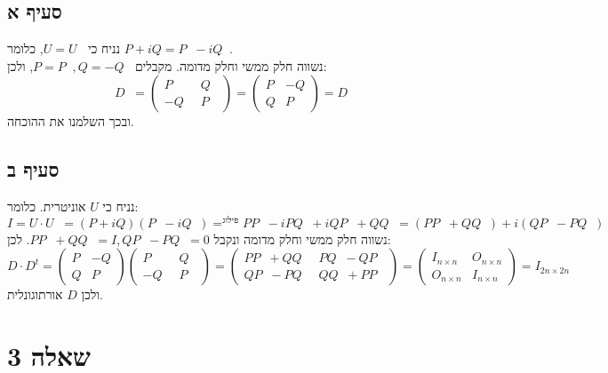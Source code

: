 \documentclass{article}
\DeclareMathOperator*{\equals}{=}
\DeclareMathOperator{\adj}{^\ast}
\DeclareMathOperator{\tra}{^t}
\begin{document}
\subsection*{סעיף א}

נניח כי $U=U\adj$, כלומר $P+iQ=P\tra -iQ \tra$. \\
נשווה חלק ממשי וחלק מדומה. מקבלים $P=P \tra, Q = -Q \tra$, ולכן:
\[
    D \tra = \begin{pmatrix}
        P \tra   & Q \tra \\
        - Q \tra & P \tra
    \end{pmatrix}= \begin{pmatrix}
        P & -Q \\
        Q & P
    \end{pmatrix} = D
\]
ובכך השלמנו את ההוכחה.

\subsection*{סעיף ב}

נניח כי $U$ אוניטרית. כלומר:
\[
    I=U\cdot U \adj = (P+iQ)(P\tra - iQ \tra) \equals^\text{פילוג}
    PP \tra - iPQ \tra + iQP \tra + QQ\tra =
    (PP\tra + QQ\tra) + i(QP \tra - PQ \tra)
\]
נשווה חלק ממשי וחלק מדומה ונקבל $PP\tra + QQ\tra=I, QP \tra - PQ \tra=0$. לכן:
\[
    D \cdot D^t =\begin{pmatrix}
        P & -Q \\
        Q & P
    \end{pmatrix} \begin{pmatrix}
        P \tra   & Q \tra \\
        - Q \tra & P \tra
    \end{pmatrix} =
    \begin{pmatrix}
        PP\tra + QQ \tra & PQ\tra - QP\tra  \\
        QP\tra - PQ\tra  & QQ\tra + PP \tra
    \end{pmatrix} =
    \begin{pmatrix}
        I_{n\times n} & O_{n\times n} \\
        O_{n\times n} & I_{n\times n}
    \end{pmatrix} =
    I_{2n \times 2n}
\]
ולכן $D$ אורתוגונלית.


\pagebreak

\section*{שאלה 3}
\end{document}
